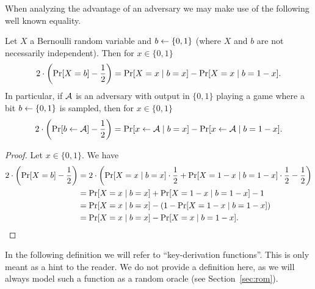 When analyzing the advantage of an adversary we may make use of the following well known equality.

\begin{lemma}
	Let $X$ a Bernoulli random variable and $b \leftarrow \{0, 1\}$ (where $X$ and $b$ are not necessarily independent). Then for $x \in \{0, 1\}$
	\[
		2 \cdot \left(\pr{X = b} - \frac{1}{2}\right) = \pr{X = x \mid b = x} - \pr{X = x \mid b = 1 - x}.
	\]
	In particular, if $\mathcal{A}$ is an adversary with output in $\{0, 1\}$ playing a game where a bit $b \leftarrow \{0, 1\}$ is sampled, then for $x \in \{0, 1\}$
	\begin{equation} \label{eq:advantage-equality}
		2 \cdot \left(\pr{b \from \adv} - \frac{1}{2}\right) = \pr{x \from \adv \mid b = x} - \pr{x \from \adv \mid b = 1 - x}.
	\end{equation}
\end{lemma}
\begin{proof}
	Let $x \in \{0, 1\}$. We have
	\begin{align*}
		2 \cdot \left(\pr{X = b} - \frac{1}{2}\right) & = 2 \cdot \left(\pr{X = x \mid b = x} \cdot \frac{1}{2} + \pr{X = 1 - x \mid b = 1 - x} \cdot \frac{1}{2} - \frac{1}{2}\right) \\
		                                              & = \pr{X = x \mid b = x} + \pr{X = 1 - x \mid b = 1 - x} - 1                                                                    \\
		                                              & = \pr{X = x \mid b = x} - (1 - \pr{X = 1 - x \mid b = 1 - x})                                                                  \\
		                                              & = \pr{X = x \mid b = x} - \pr{X = x \mid b = 1 - x}.
	\end{align*}
\end{proof}

In the following definition we will refer to ``key-derivation functions''. This is only meant as a hint to the reader. We do not provide a definition here, as we will always model such a function as a random oracle (see Section~\vref{sec:rom}). 


